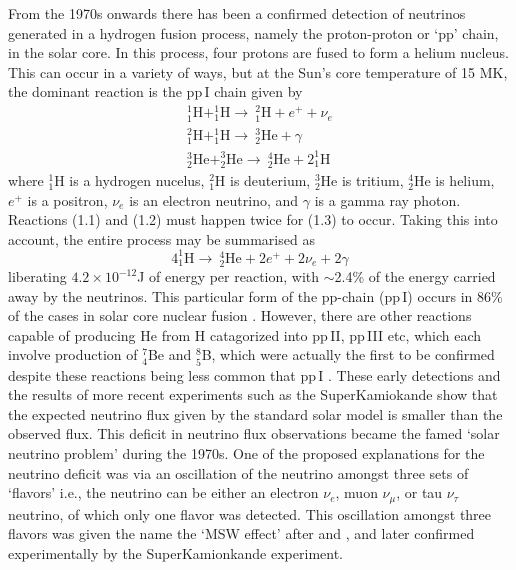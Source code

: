 From the 1970s onwards there has been a confirmed detection of neutrinos generated in a hydrogen fusion process, namely the proton-proton or `pp' chain, in the solar core. In this process, four protons are fused to form a helium nucleus. This can occur in a variety of ways, but at the Sun's core temperature of 15 MK, the dominant reaction is the pp\,I chain given by
\begin{eqnarray}
^{1}_1\mathrm{H} + ^{1}_1\mathrm{H} \rightarrow ~^{2}_1\mathrm{H} + e^{+}  + \nu_e \\
%
^{2}_1\mathrm{H} + ^{1}_1\mathrm{H} \rightarrow ~^{3}_2\mathrm{He} + \gamma \\
%
^{3}_2\mathrm{He}+^{3}_2\mathrm{He} \rightarrow ~^{4}_2\mathrm{He} + 2^{1}_1\mathrm{H}
\end{eqnarray}
where $^{1}_1\mathrm{H}$ is a hydrogen nucelus, $^{2}_1\mathrm{H}$ is deuterium, $^{3}_2\mathrm{He}$ is tritium, $^{4}_2\mathrm{He}$ is helium, $e^{+}$ is a positron, $\nu_e$ is an electron neutrino, and $\gamma$ is a gamma ray photon. Reactions (1.1) and (1.2) must happen twice for (1.3) to occur. Taking this into account, the entire process may be summarised as 
\begin{equation}
4 ^{1}_1\mathrm{H}  \rightarrow ~^{4}_2\mathrm{He} + 2e^{+} + 2\nu_e + 2\gamma
\end{equation}
liberating $4.2\times10^{-12}$J of energy per reaction, with $\sim$2.4\% of the energy carried away by the neutrinos. This particular form of the pp-chain (pp\,I) occurs in 86\% of the cases in solar core nuclear fusion \citep{turk2011}. However, there are other reactions capable of producing He from H catagorized into pp\,II, pp\,III etc, which each involve production of $^7_4$Be and $^8_5$B, which were actually the first to be confirmed despite these reactions being less common that pp\,I \citep{davis1968}. 
These early detections and the results of more recent experiments such as the SuperKamiokande \citep{fukuda1998} show that the expected neutrino flux given by the standard solar model is smaller than the observed flux. This deficit in neutrino flux observations became the famed `solar neutrino problem' during the 1970s. 
One of the proposed explanations for the neutrino deficit was via an oscillation of the neutrino amongst three sets of `flavors' i.e., the neutrino can be either an electron $\nu_e$, muon $\nu_{\mu}$, or tau $\nu_{\tau}$ neutrino, of which only one flavor was detected.
This oscillation amongst three flavors was given the name the `MSW effect' after \citet{mikheev1986} and \citet{wolfenstein1978}, and later confirmed experimentally by the SuperKamionkande experiment.

